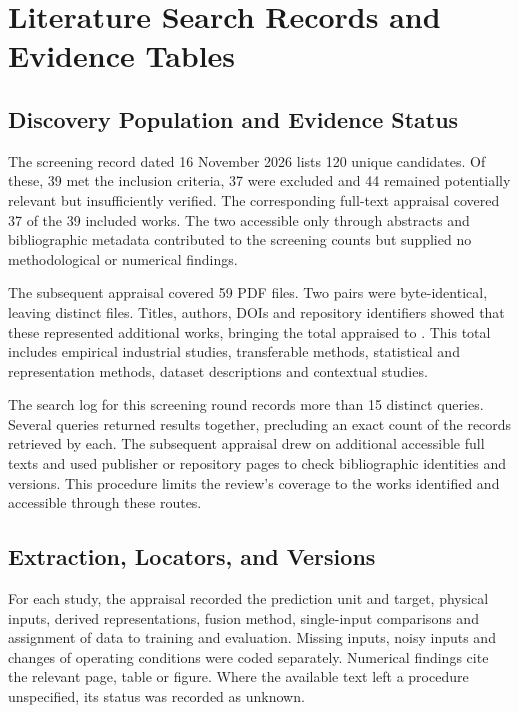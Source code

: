 \chapter{Literature Search Records and Evidence Tables}
\label{app:literature}
\section{Discovery Population and Evidence Status}
The screening record dated 16 November 2026 lists 120 unique candidates. Of these, 39 met the inclusion criteria, 37 were excluded and 44 remained potentially relevant but insufficiently verified. The corresponding full-text appraisal covered 37 of the 39 included works. The two accessible only through abstracts and bibliographic metadata contributed to the screening counts but supplied no methodological or numerical findings.

The subsequent appraisal covered 59 PDF files. Two pairs were byte-identical, leaving \ExpandedPDFCount{} distinct files. Titles, authors, DOIs and repository identifiers showed that these represented \ExpandedPDFCount{} additional works, bringing the total appraised to \ReviewWorkCount{}. This total includes empirical industrial studies, transferable methods, statistical and representation methods, dataset descriptions and contextual studies.

The search log for this screening round records more than 15 distinct queries. Several queries returned results together, precluding an exact count of the records retrieved by each. The subsequent appraisal drew on additional accessible full texts and used publisher or repository pages to check bibliographic identities and versions. This procedure limits the review's coverage to the works identified and accessible through these routes.

\section{Extraction, Locators, and Versions}
For each study, the appraisal recorded the prediction unit and target, physical inputs, derived representations, fusion method, single-input comparisons and assignment of data to training and evaluation. Missing inputs, noisy inputs and changes of operating conditions were coded separately. Numerical findings cite the relevant page, table or figure. Where the available text left a procedure unspecified, its status was recorded as unknown.


